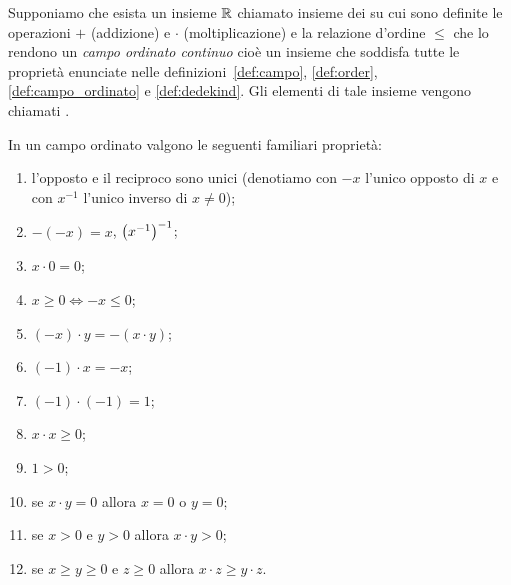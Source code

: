 \begin{axiom}
Supponiamo
\mymargin{$\RR$}%
che esista un insieme $\RR$
chiamato insieme dei
%
su cui sono definite le
operazioni $+$ (addizione) e $\cdot$ (moltiplicazione)
e la relazione d'ordine $\le$ che
lo rendono un \emph{campo ordinato continuo} cioè
un insieme che soddisfa tutte le proprietà enunciate
nelle definizioni~\ref{def:campo},
\ref{def:order}, \ref{def:campo_ordinato} e \ref{def:dedekind}.
Gli elementi di tale insieme vengono chiamati .
\end{axiom}

\begin{theorem}
\label{th:campo_ordinato}%
In un campo ordinato
valgono le seguenti
familiari proprietà:
\begin{enumerate}
  \item l'opposto e il reciproco sono unici
  (denotiamo con $-x$ l'unico opposto di $x$ e con $x^{-1}$ l'unico inverso di $x\neq 0$);
  \item $-(-x) = x$, ${\left( x^{-1} \right)}^{-1}$;
  \item $x \cdot 0 = 0$;
  \item $x\ge 0 \iff -x \le 0$;
  \item $(-x)\cdot y = -(x\cdot y)$;
  \item $(-1)\cdot x = -x$;
  \item $(-1)\cdot(-1) = 1$;
  \item $x\cdot x \ge 0$;
  \item $1 > 0$;
  \item se $x\cdot y = 0$ allora $x = 0$ o $y = 0$;
  \item se $x>0$ e $y>0$  allora $x\cdot y > 0$;
  \item se $x\ge y\ge 0$ e $z\ge 0$ allora $x\cdot z \ge y \cdot z$.
\end{enumerate}
\end{theorem}
%
